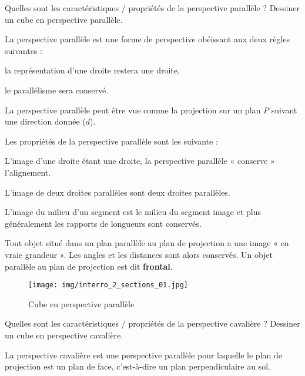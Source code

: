 \documentclass{exam}
\begin{document}
\begin{questions}

  \question[3] Quelles sont les caractéristiques / propriétés de la perspective parallèle ? Dessiner un cube en perspective parallèle.

  \begin{solution}

    La perspective parallèle est une forme de perspective obéissant aux deux règles suivantes :
    \begin{compactitem}
        \item la représentation d'une droite restera une droite,
        \item le parallélisme sera conservé.
    \end{compactitem}
    
    La perspective parallèle peut être vue comme la projection sur un plan \(P\) suivant une direction donnée (\(d\)).
    

    Les propriétés de la perspective parallèle sont les suivante : 
    \begin{compactitem}
      \item L'image d'une droite étant une droite, la perspective parallèle « conserve » l'alignement.
      \item L'image de deux droites parallèles sont deux droites parallèles.
      \item L'image du milieu d'un segment est le milieu du segment image et plus généralement les rapports de longueurs sont conservés.
      \item Tout objet situé dans un plan parallèle au plan de projection a une image « en vraie grandeur ». Les angles et les distances sont alors conservés. Un objet parallèle au plan de projection est dit \textbf{frontal}.
  \end{compactitem}

  \begin{figure}[H]
    \centering
    \texttt{[image: img/interro\_2\_sections\_01.jpg]}
    \captionsetup{labelformat=empty}
    \caption{\label{} Cube en perspective parallèle}
  \end{figure}
  \end{solution}

\question[3] Quelles sont les caractéristiques / propriétés de la perspective cavalière ? Dessiner un cube en perspective cavalière.

\begin{solution}


La perspective cavalière est une perspective parallèle pour laquelle le plan de projection est un plan de face, c'est-à-dire un plan perpendiculaire au sol.  


\end{solution}
\end{questions}
\end{document}
